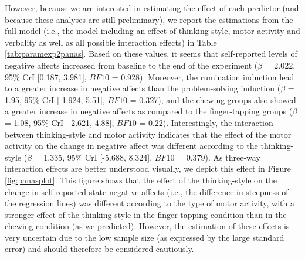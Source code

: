 \documentclass[a4paper,12pt,twoside,onecolumn,openright,final,oldfontcommands]{memoir}
\begin{document}
However, because we are interested in estimating the effect of each predictor (and because these analyses are still preliminary), we report the estimations from the full model (i.e., the model including an effect of thinking-style, motor activity and verbality as well as all possible interaction effects) in Table \ref{tab:paramexp2panas}. Based on these values, it seems that self-reported levels of negative affects increased from baseline to the end of the experiment (\(\beta\) = 2.022, 95\% CrI {[}0.187, 3.981{]}, \(BF10\) = 0.928). Moreover, the rumination induction lead to a greater increase in negative affects than the problem-solving induction (\(\beta\) = 1.95, 95\% CrI {[}-1.924, 5.51{]}, \(BF10\) = 0.327), and the chewing groups also showed a greater increase in negative affects as compared to the finger-tapping groups (\(\beta\) = 1.08, 95\% CrI {[}-2.621, 4.88{]}, \(BF10\) = 0.22). Interestingly, the interaction between thinking-style and motor activity indicates that the effect of the motor activity on the change in negative affect was different according to the thinking-style (\(\beta\) = 1.335, 95\% CrI {[}-5.688, 8.324{]}, \(BF10\) = 0.379). As three-way interaction effects are better understood visually, we depict this effect in Figure \ref{fig:panasplot}. This figure shows that the effect of the thinking-style on the change in self-reported state negative affects (i.e., the difference in steepness of the regression lines) was different according to the type of motor activity, with a stronger effect of the thinking-style in the finger-tapping condition than in the chewing condition (as we predicted). However, the estimation of these effects is very uncertain due to the low sample size (as expressed by the large standard error) and should therefore be considered cautiously.
\end{document}
